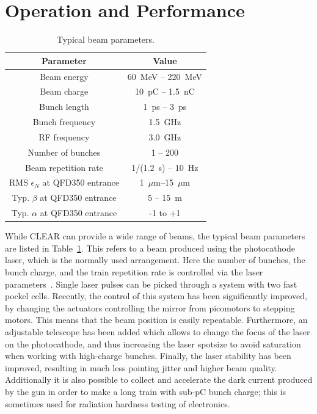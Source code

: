 \documentclass[a4paper,
               keeplastbox,   %
               ]{jacow}
\begin{document}
\section{Operation and Performance}

\begin{table}[t]
  \centering
  \caption{Typical beam parameters.}
  \label{tab:beamparameters}
  \begin{tabular}{c c}
    \toprule
    \textbf{Parameter} & \textbf{Value} \\
    \midrule
    Beam energy       &  60~MeV -- 220~MeV\\
    Beam charge       &  10~pC  -- 1.5~nC \\
    Bunch length      &   1~ps  -- 3~ps \\
    Bunch frequency   &   1.5~GHz \\
    RF frequency      &   3.0~GHz \\
    Number of bunches &   1 -- 200 \\
    Beam repetition rate   & 1/(1.2~s) -- 10~Hz \\
    RMS $\epsilon_N$ at QFD350 entrance & 1~$\mu$m--15~$\mu$m\\
    Typ. $\beta$ at QFD350 entrance & 5 -- 15~m \\
    Typ. $\alpha$ at QFD350 entrance & -1 to +1 \\
    \bottomrule
  \end{tabular}
\end{table}

While CLEAR can provide a wide range of beams, the typical beam parameters are listed in Table~\ref{tab:beamparameters}.
This refers to a beam produced using the photocathode laser, which is the normally used arrangement.
Here the number of bunches, the bunch charge, and the train repetition rate is controlled via the laser parameters~\cite{LucaGun,BrossardGun}.
Single laser pulses can be picked through a system with two fast pockel cells.
Recently, the control of this system has been significantly improved, by changing the actuators controlling the mirror from picomotors to stepping motors.
This means that the beam position is easily repeatable.
Furthermore, an adjustable telescope has been added which allows to change the focus of the laser on the photocathode, and thus increasing the laser spotsize to avoid saturation when working with high-charge bunches.
Finally, the laser stability has been improved, resulting in much less pointing jitter and higher beam quality.
Additionally it is also possible to collect and accelerate the dark current produced by the gun in order to make a long train with sub-pC bunch charge; this is sometimes used for radiation hardness testing of electronics.
\end{document}
